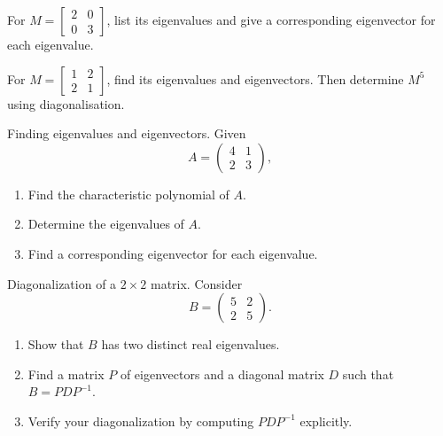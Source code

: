 \documentclass[11pt]{article}
\def\textbf#1{#1}%
\newcounter{question}
\begin{document}
\newpage


\begin{question}
For $M=\begin{bmatrix}2&0\\0&3\end{bmatrix}$, list its eigenvalues and give a corresponding eigenvector for each eigenvalue.
\end{question}

\begin{question}
For $M=\begin{bmatrix}1&2\\2&1\end{bmatrix}$, find its eigenvalues and eigenvectors.  Then determine $M^5$ using diagonalisation.
\end{question}


\begin{question}
\textbf{Finding eigenvalues and eigenvectors.}
Given 
\[
A = \begin{pmatrix} 4 & 1 \\ 2 & 3 \end{pmatrix},
\]
\begin{enumerate}
    \item Find the characteristic polynomial of $A$.
    \item Determine the eigenvalues of $A$.
    \item Find a corresponding eigenvector for each eigenvalue.
\end{enumerate}
\end{question}

\begin{question}
\textbf{Diagonalization of a $2\times 2$ matrix.}
Consider 
\[
B = \begin{pmatrix} 5 & 2 \\ 2 & 5 \end{pmatrix}.
\]
\begin{enumerate}
    \item Show that $B$ has two distinct real eigenvalues.
    \item Find a matrix $P$ of eigenvectors and a diagonal matrix $D$ such that $B = PDP^{-1}$.
    \item Verify your diagonalization by computing $PDP^{-1}$ explicitly.
\end{enumerate}
\end{question}
\end{document}
